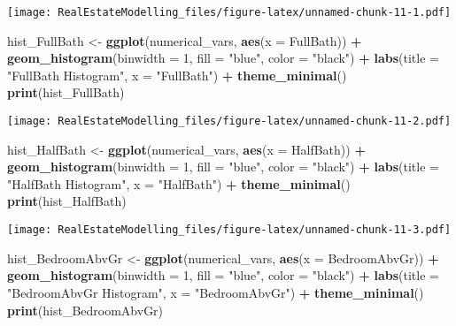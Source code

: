\documentclass[
]{article}
\newenvironment{Shaded}{\begin{snugshade}}{\end{snugshade}}
\newcommand{\AttributeTok}[1]{\textcolor[rgb]{0.13,0.29,0.53}{#1}}
\newcommand{\DecValTok}[1]{\textcolor[rgb]{0.00,0.00,0.81}{#1}}
\newcommand{\FunctionTok}[1]{\textcolor[rgb]{0.13,0.29,0.53}{\textbf{#1}}}
\newcommand{\NormalTok}[1]{#1}
\newcommand{\OtherTok}[1]{\textcolor[rgb]{0.56,0.35,0.01}{#1}}
\newcommand{\SpecialCharTok}[1]{\textcolor[rgb]{0.81,0.36,0.00}{\textbf{#1}}}
\newcommand{\StringTok}[1]{\textcolor[rgb]{0.31,0.60,0.02}{#1}}
\begin{document}
\texttt{[image: RealEstateModelling\_files/figure-latex/unnamed-chunk-11-1.pdf]}

\begin{Shaded}
\begin{Highlighting}[]
\NormalTok{hist\_FullBath }\OtherTok{\textless{}{-}} \FunctionTok{ggplot}\NormalTok{(numerical\_vars, }\FunctionTok{aes}\NormalTok{(}\AttributeTok{x =}\NormalTok{ FullBath)) }\SpecialCharTok{+}
  \FunctionTok{geom\_histogram}\NormalTok{(}\AttributeTok{binwidth =} \DecValTok{1}\NormalTok{, }\AttributeTok{fill =} \StringTok{"blue"}\NormalTok{, }\AttributeTok{color =} \StringTok{"black"}\NormalTok{) }\SpecialCharTok{+}
  \FunctionTok{labs}\NormalTok{(}\AttributeTok{title =} \StringTok{"FullBath Histogram"}\NormalTok{, }\AttributeTok{x =} \StringTok{"FullBath"}\NormalTok{) }\SpecialCharTok{+}
  \FunctionTok{theme\_minimal}\NormalTok{()}
\FunctionTok{print}\NormalTok{(hist\_FullBath)}
\end{Highlighting}
\end{Shaded}

\texttt{[image: RealEstateModelling\_files/figure-latex/unnamed-chunk-11-2.pdf]}

\begin{Shaded}
\begin{Highlighting}[]
\NormalTok{hist\_HalfBath }\OtherTok{\textless{}{-}} \FunctionTok{ggplot}\NormalTok{(numerical\_vars, }\FunctionTok{aes}\NormalTok{(}\AttributeTok{x =}\NormalTok{ HalfBath)) }\SpecialCharTok{+}
  \FunctionTok{geom\_histogram}\NormalTok{(}\AttributeTok{binwidth =} \DecValTok{1}\NormalTok{, }\AttributeTok{fill =} \StringTok{"blue"}\NormalTok{, }\AttributeTok{color =} \StringTok{"black"}\NormalTok{) }\SpecialCharTok{+}
  \FunctionTok{labs}\NormalTok{(}\AttributeTok{title =} \StringTok{"HalfBath Histogram"}\NormalTok{, }\AttributeTok{x =} \StringTok{"HalfBath"}\NormalTok{) }\SpecialCharTok{+}
  \FunctionTok{theme\_minimal}\NormalTok{()}
\FunctionTok{print}\NormalTok{(hist\_HalfBath)}
\end{Highlighting}
\end{Shaded}

\texttt{[image: RealEstateModelling\_files/figure-latex/unnamed-chunk-11-3.pdf]}

\begin{Shaded}
\begin{Highlighting}[]
\NormalTok{hist\_BedroomAbvGr }\OtherTok{\textless{}{-}} \FunctionTok{ggplot}\NormalTok{(numerical\_vars, }\FunctionTok{aes}\NormalTok{(}\AttributeTok{x =}\NormalTok{ BedroomAbvGr)) }\SpecialCharTok{+}
  \FunctionTok{geom\_histogram}\NormalTok{(}\AttributeTok{binwidth =} \DecValTok{1}\NormalTok{, }\AttributeTok{fill =} \StringTok{"blue"}\NormalTok{, }\AttributeTok{color =} \StringTok{"black"}\NormalTok{) }\SpecialCharTok{+}
  \FunctionTok{labs}\NormalTok{(}\AttributeTok{title =} \StringTok{"BedroomAbvGr Histogram"}\NormalTok{, }\AttributeTok{x =} \StringTok{"BedroomAbvGr"}\NormalTok{) }\SpecialCharTok{+}
  \FunctionTok{theme\_minimal}\NormalTok{()}
\FunctionTok{print}\NormalTok{(hist\_BedroomAbvGr)}
\end{Highlighting}
\end{Shaded}
\end{document}

